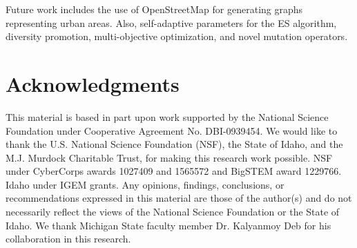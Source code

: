 \documentclass{sig-alternate-05-2015}
\begin{document}

Future work includes the use of OpenStreetMap
\cite{OpenStreetMap} for generating graphs representing urban areas.
Also, self-adaptive parameters for the ES algorithm, diversity promotion,
multi-objective optimization, and novel mutation operators.

\section{Acknowledgments}\label{sec:acknowledgments}
This material is based in part upon work supported by the National
Science Foundation under Cooperative Agreement No.  DBI-0939454.  We
would like to thank the U.S. National Science Foundation (NSF), the
State of Idaho, and the M.J. Murdock Charitable Trust, for making this
research work possible.  NSF under CyberCorps{\regsup} awards 1027409
and 1565572 and BigSTEM award 1229766.  Idaho under IGEM grants.  Any
opinions, findings, conclusions, or recommendations expressed in this
material are those of the author(s) and do not necessarily reflect the
views of the National Science Foundation or the State of Idaho.  We
thank Michigan State faculty member Dr. Kalyanmoy Deb for his
collaboration in this research.



\end{document}
